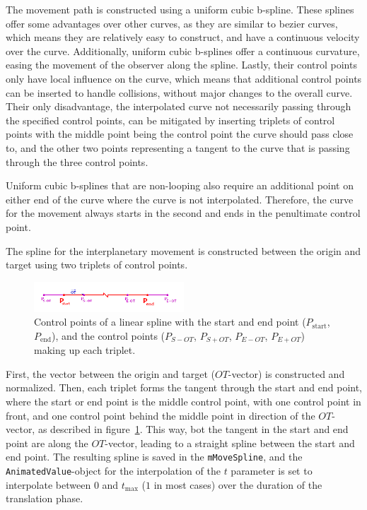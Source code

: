 The movement path is constructed using a uniform cubic b-spline.
These splines offer some advantages over other curves, as they are similar to bezier curves, which means
they are relatively easy to construct, and have a continuous velocity over the curve.
Additionally, uniform cubic b-splines offer a continuous curvature, easing the movement of the observer along the
spline.
Lastly, their control points only have local influence on the curve, which means that additional control points can
be inserted to handle collisions, without major changes to the overall curve.
Their only disadvantage, the interpolated curve not necessarily passing through the specified control points, can be
mitigated by inserting triplets of control points with the middle point being the control point the curve should pass
close to, and the other two points representing a tangent to the curve that is passing through the three control points.

Uniform cubic b-splines that are non-looping also require an additional point on either end of the curve where the
curve is not interpolated.
Therefore, the curve for the movement always starts in the second and ends in the penultimate control point.

The spline for the interplanetary movement is constructed between the origin and target using two triplets of control
points.

\begin{figure}[h]
    \centering
    \includegraphics[width=0.5\textwidth]{content/4_3_autoNavigation/img/LinearSplinePoints}
    \caption{Control points of a linear spline with the start and end point ($P_{\mathrm{start}}$,
        $P_{\mathrm{end}}$), and the control points ($P_{S-OT}$, $P_{S+OT}$, $P_{E-OT}$, $P_{E+OT}$) making up each
        triplet.}
    \label{fig:linear-control-points}
\end{figure}

First, the vector between the origin and target ($OT$-vector) is constructed and normalized.
Then, each triplet forms the tangent through the start and end point, where the start or end point is the middle
control point, with one control point in front, and one control point behind the middle point in direction of the
$OT$-vector, as described in figure~\ref{fig:linear-control-points}.
This way, bot the tangent in the start and end point are along the $OT$-vector, leading to a straight spline between
the start and end point.
The resulting spline is saved in the \texttt{mMoveSpline}, and the \texttt{AnimatedValue}-object for the
interpolation of the $t$ parameter is set to interpolate between $0$ and $t_{\mathrm{max}}$ ($1$ in most cases) over the
duration of the translation phase.


